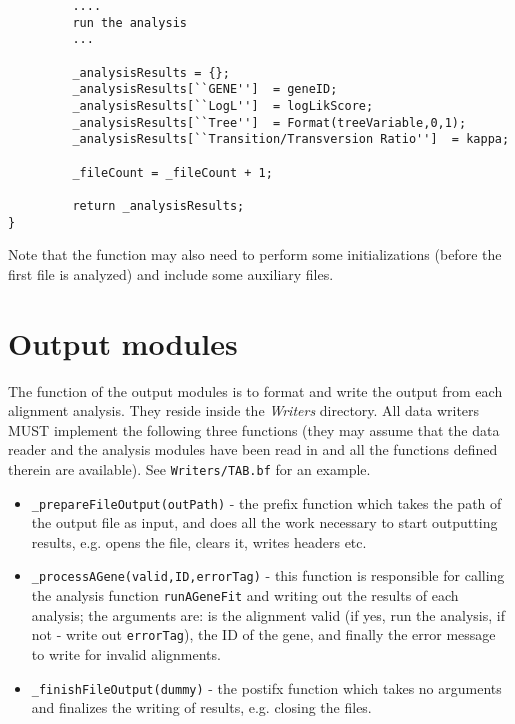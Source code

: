 \documentclass[12pt]{article}
\begin{document}
\begin{itemize}
\begin{verbatim}
         ....
         run the analysis
         ...
	
         _analysisResults = {};
         _analysisResults[``GENE'']  = geneID;
         _analysisResults[``LogL'']  = logLikScore;
         _analysisResults[``Tree'']  = Format(treeVariable,0,1);
         _analysisResults[``Transition/Transversion Ratio'']  = kappa;
	
         _fileCount = _fileCount + 1;
	
         return _analysisResults;
}
\end{verbatim}

Note that the function may also need to perform some initializations (before the first file is analyzed) 
and include some auxiliary files. 

\end{itemize}

\section{Output modules}

The function of the output modules is to format and write the output from each alignment analysis. 
They reside inside the \textit{Writers} directory. All data writers MUST implement the following three functions
(they may assume that the data reader and the analysis modules have been read in and all the functions
defined therein are available). See {\tt Writers/TAB.bf} for an example. 

\begin{itemize}
\item {\tt \_prepareFileOutput(outPath)} - the prefix function which takes the path of the output file as 
input, and does all the work necessary to start outputting results, e.g. opens the file, clears it, 
writes headers etc. 

\item {\tt \_processAGene(valid,ID,errorTag)} - this function is responsible for calling the analysis function {\tt runAGeneFit} and 
writing out the results of each analysis; the arguments are: is the alignment valid (if yes, run the analysis, if 
not - write out {\tt errorTag}), the ID of the gene, and finally the error message to write for invalid alignments. 

\item {\tt \_finishFileOutput(dummy)} - the postifx function which takes no arguments and finalizes the writing of results, 
e.g. closing the files.
\end{itemize}
\end{document}

